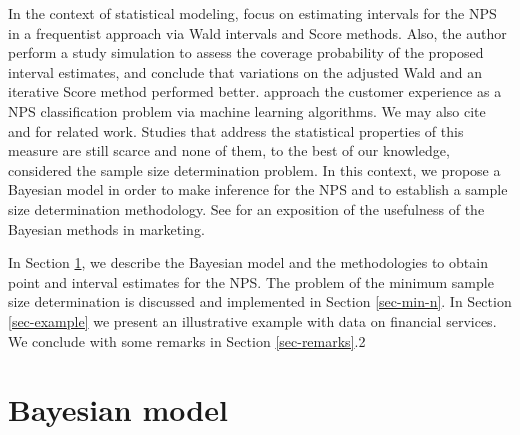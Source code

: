 \documentclass[12pt,a4paper]{article}%
\begin{document}


In the context of statistical modeling, \cite{Rocks2016} focus on estimating intervals for the NPS in a frequentist approach via Wald intervals and Score methods. Also, the author perform a study simulation to assess the coverage probability of the proposed interval estimates, and conclude that variations on the adjusted Wald and an iterative Score method performed better. \cite{Markoulidakisetal2021} approach the customer experience as a NPS classification problem via machine learning algorithms. We may also cite \cite{EskildsenKristensen11} and \cite{KristensenEskildsen14} for related work. Studies that address the statistical properties of this measure are still scarce and none of them, to the best of our knowledge, considered the sample size determination problem. In this context, we propose a Bayesian model in order to make inference for the NPS and to establish a sample size determination methodology. See \cite{RossiAllenby03} for an exposition of the usefulness of the Bayesian methods in marketing.





In Section \ref{sec-bayes-model}, we describe the Bayesian model and the methodologies to obtain point and interval estimates for the NPS. The problem of the minimum sample size determination is discussed and implemented in Section \ref{sec-min-n}. In Section \ref{sec-example} we present an illustrative example with data on financial services. We conclude with some remarks in Section \ref{sec-remarks}.2


\section{Bayesian model}\label{sec-bayes-model}
\end{document}
